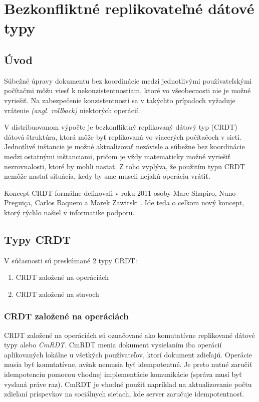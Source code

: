 \chapter{Bezkonfliktné replikovateľné dátové typy}

\label{kap:cdrt} %

\section{Úvod}

Súbežné úpravy dokumentu bez koordinácie medzi jednotlivými používateľskými počítačmi môžu viesť k
nekonzistentnostiam, ktoré vo všeobecnosti nie je možné vyriešiť. Na zabezpečenie konzistentnosti sa
v takýchto prípadoch vyžaduje vrátenie \textit{(angl. rollback)} niektorých operácií.

V distribuovanom výpočte je bezkonfliktný replikovaný dátový typ (CRDT) dátová štruktúra,
ktorá môže byť replikovaná vo viacerých počítačoch v sieti. Jednotlivé inštancie je možné
aktualizovať nezávisle a súbežne bez koordinácie medzi ostatnými inštanciami, pričom je vždy
matematicky možné vyriešiť nezrovnalosti, ktoré by mohli nastať. Z toho vyplýva, že použitím typu
CRDT nemôže nastať situácia, kedy by sme museli nejakú operáciu vrátiť. 

Koncept CRDT formálne definovali v roku 2011 osoby
Marc Shapiro, Nuno Preguiça, Carlos Baquero a Marek Zawirski \cite{crdt_definition}.
Ide teda o celkom nový koncept, ktorý rýchlo našiel v informatike podporu.

\section{Typy CRDT}
V súčasnosti sú preskúmané 2 typy CRDT:
\begin{enumerate}
  \item CRDT založené na operáciách
  \item CRDT založené na stavoch
\end{enumerate}

\subsection{CRDT založené na operáciách}
CRDT založené na operáciách sú označované ako komutatívne replikované dátové typy alebo 
\textit{CmRDT}. CmRDT menia dokument vysielaním iba operácií aplikovaných lokálne
u všetkých používateľov, ktorí dokument zdieľajú. Operácie musia byť komutatívne, avšak nemusia 
byť idempotentné. Je preto nutné zaručiť idempotenciu pomocou vhodnej implementácie
komunikácie (správa musí byť vyslaná práve raz). 
CmRDT je vhodné použiť napríklad na aktualizovanie počtu zdieľaní
príspevkov na sociálnych sieťach, kde server zaručuje idempotentnosť. 

